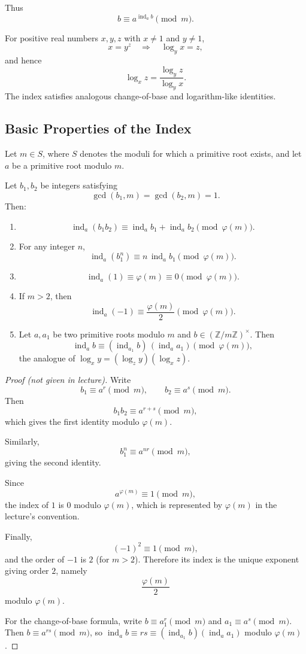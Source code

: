 \documentclass[11pt]{article}
\theoremstyle{remark}
\DeclareMathOperator{\gcdop}{gcd}
\DeclareMathOperator{\ind}{ind}
\newcommand{\phiE}{\varphi}
\newcommand{\units}[1]{\left(\mathbb Z/#1\mathbb Z\right)^\times}
\begin{document}
Thus
\[
    b\equiv a^{\ind_a b}\pmod m.
\]

For positive real numbers $x,y,z$ with $x\neq 1$ and $y\neq 1$,
\[
    x=y^z
    \quad\Longrightarrow\quad
    \log_y x=z,
\]
and hence
\[
    \log_x z
    =
    \frac{\log_y z}{\log_y x}.
\]
The index satisfies analogous change-of-base and logarithm-like identities.

\subsection{Basic Properties of the Index}

Let $m\in S$, where $S$ denotes the moduli for which a primitive root
exists, and let $a$ be a primitive root modulo $m$.

Let $b_1,b_2$ be integers satisfying
\[
    \gcdop(b_1,m)=\gcdop(b_2,m)=1.
\]
Then:

\begin{enumerate}[label=\Roman*.]
    \item
    \[
        \ind_a(b_1b_2)
        \equiv
        \ind_a b_1+\ind_a b_2
        \pmod{\phiE(m)}.
    \]

    \item For any integer $n$,
    \[
        \ind_a(b_1^n)
        \equiv
        n\,\ind_a b_1
        \pmod{\phiE(m)}.
    \]

    \item
    \[
        \ind_a(1)
        \equiv
        \phiE(m)
        \equiv0
        \pmod{\phiE(m)}.
    \]

    \item If $m>2$, then
    \[
        \ind_a(-1)
        \equiv
        \frac{\phiE(m)}2
        \pmod{\phiE(m)}.
    \]

    \item Let $a,a_1$ be two primitive roots modulo $m$ and $b\in\units m$.
    Then
    \[
        \ind_a b
        \equiv
        (\ind_{a_1} b)\,(\ind_a a_1)
        \pmod{\phiE(m)},
    \]
    the analogue of $\log_x y=(\log_z y)(\log_x z)$.
\end{enumerate}

\begin{proof}[Proof (not given in lecture)]
Write
\[
    b_1\equiv a^{r}\pmod m,
    \qquad
    b_2\equiv a^{s}\pmod m.
\]
Then
\[
    b_1b_2\equiv a^{r+s}\pmod m,
\]
which gives the first identity modulo $\phiE(m)$.

Similarly,
\[
    b_1^n\equiv a^{nr}\pmod m,
\]
giving the second identity.

Since
\[
    a^{\phiE(m)}\equiv1\pmod m,
\]
the index of $1$ is $0$ modulo $\phiE(m)$, which is represented by
$\phiE(m)$ in the lecture's convention.

Finally,
\[
    (-1)^2\equiv1\pmod m,
\]
and the order of $-1$ is $2$ (for $m>2$). Therefore its index is the
unique exponent giving order $2$, namely
\[
    \frac{\phiE(m)}2
\]
modulo $\phiE(m)$.

For the change-of-base formula, write $b\equiv a_1^{r}\pmod m$ and
$a_1\equiv a^{s}\pmod m$. Then $b\equiv a^{rs}\pmod m$, so
$\ind_a b\equiv rs\equiv(\ind_{a_1}b)(\ind_a a_1)$ modulo $\phiE(m)$.
\end{proof}
\end{document}
